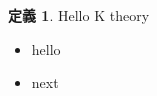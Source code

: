 \documentclass[dvipdfmx]{jsarticle}
\theoremstyle{definition}
\newtheorem*{tDefinition}{定義}
\newenvironment{Mini}{
  \begin{minipage}[t]{0.9\hsize}
  \setlength{\parindent}{12pt}
  \begin{itemize}
  \setlength{\labelsep}{10pt}
}{
  \end{itemize}
  \vspace{5pt}
  \end{minipage}
}
\newenvironment{Definition}[1]{
  \begin{tDefinition}
    #1 \\
  \begin{Mini}
}{
  \end{Mini}
  \end{tDefinition}
}
\begin{document}
\begin{Definition}{Hello K theory}
\item hello
\item next
\end{Definition}
\end{document}

